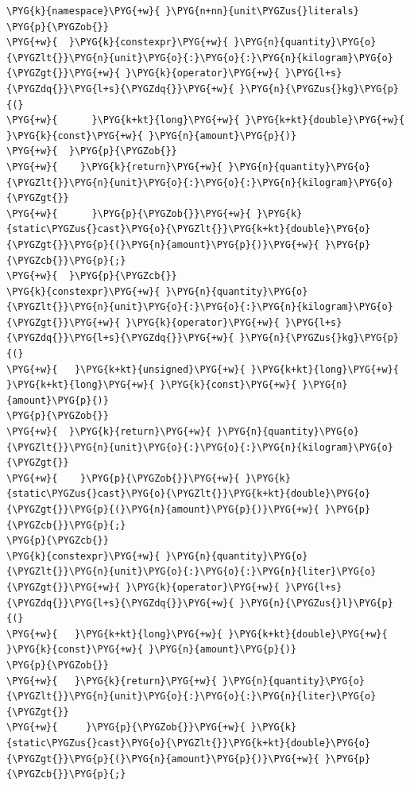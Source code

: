 \begin{itemize}

\begin{codeblockbg}
\begin{Verbatim}[commandchars=\\\{\},breaklines=true,breakanywhere=true,fontsize=\codefont,xleftmargin=17bp]
\PYG{k}{namespace}\PYG{+w}{ }\PYG{n+nn}{unit\PYGZus{}literals}
\PYG{p}{\PYGZob{}}
\PYG{+w}{  }\PYG{k}{constexpr}\PYG{+w}{ }\PYG{n}{quantity}\PYG{o}{\PYGZlt{}}\PYG{n}{unit}\PYG{o}{:}\PYG{o}{:}\PYG{n}{kilogram}\PYG{o}{\PYGZgt{}}\PYG{+w}{ }\PYG{k}{operator}\PYG{+w}{ }\PYG{l+s}{\PYGZdq{}}\PYG{l+s}{\PYGZdq{}}\PYG{+w}{ }\PYG{n}{\PYGZus{}kg}\PYG{p}{(}
\PYG{+w}{      }\PYG{k+kt}{long}\PYG{+w}{ }\PYG{k+kt}{double}\PYG{+w}{ }\PYG{k}{const}\PYG{+w}{ }\PYG{n}{amount}\PYG{p}{)}
\PYG{+w}{  }\PYG{p}{\PYGZob{}}
\PYG{+w}{    }\PYG{k}{return}\PYG{+w}{ }\PYG{n}{quantity}\PYG{o}{\PYGZlt{}}\PYG{n}{unit}\PYG{o}{:}\PYG{o}{:}\PYG{n}{kilogram}\PYG{o}{\PYGZgt{}}
\PYG{+w}{      }\PYG{p}{\PYGZob{}}\PYG{+w}{ }\PYG{k}{static\PYGZus{}cast}\PYG{o}{\PYGZlt{}}\PYG{k+kt}{double}\PYG{o}{\PYGZgt{}}\PYG{p}{(}\PYG{n}{amount}\PYG{p}{)}\PYG{+w}{ }\PYG{p}{\PYGZcb{}}\PYG{p}{;}
\PYG{+w}{  }\PYG{p}{\PYGZcb{}}
\PYG{k}{constexpr}\PYG{+w}{ }\PYG{n}{quantity}\PYG{o}{\PYGZlt{}}\PYG{n}{unit}\PYG{o}{:}\PYG{o}{:}\PYG{n}{kilogram}\PYG{o}{\PYGZgt{}}\PYG{+w}{ }\PYG{k}{operator}\PYG{+w}{ }\PYG{l+s}{\PYGZdq{}}\PYG{l+s}{\PYGZdq{}}\PYG{+w}{ }\PYG{n}{\PYGZus{}kg}\PYG{p}{(}
\PYG{+w}{   }\PYG{k+kt}{unsigned}\PYG{+w}{ }\PYG{k+kt}{long}\PYG{+w}{ }\PYG{k+kt}{long}\PYG{+w}{ }\PYG{k}{const}\PYG{+w}{ }\PYG{n}{amount}\PYG{p}{)}
\PYG{p}{\PYGZob{}}
\PYG{+w}{  }\PYG{k}{return}\PYG{+w}{ }\PYG{n}{quantity}\PYG{o}{\PYGZlt{}}\PYG{n}{unit}\PYG{o}{:}\PYG{o}{:}\PYG{n}{kilogram}\PYG{o}{\PYGZgt{}}
\PYG{+w}{    }\PYG{p}{\PYGZob{}}\PYG{+w}{ }\PYG{k}{static\PYGZus{}cast}\PYG{o}{\PYGZlt{}}\PYG{k+kt}{double}\PYG{o}{\PYGZgt{}}\PYG{p}{(}\PYG{n}{amount}\PYG{p}{)}\PYG{+w}{ }\PYG{p}{\PYGZcb{}}\PYG{p}{;}
\PYG{p}{\PYGZcb{}}
\PYG{k}{constexpr}\PYG{+w}{ }\PYG{n}{quantity}\PYG{o}{\PYGZlt{}}\PYG{n}{unit}\PYG{o}{:}\PYG{o}{:}\PYG{n}{liter}\PYG{o}{\PYGZgt{}}\PYG{+w}{ }\PYG{k}{operator}\PYG{+w}{ }\PYG{l+s}{\PYGZdq{}}\PYG{l+s}{\PYGZdq{}}\PYG{+w}{ }\PYG{n}{\PYGZus{}l}\PYG{p}{(}
\PYG{+w}{   }\PYG{k+kt}{long}\PYG{+w}{ }\PYG{k+kt}{double}\PYG{+w}{ }\PYG{k}{const}\PYG{+w}{ }\PYG{n}{amount}\PYG{p}{)}
\PYG{p}{\PYGZob{}}
\PYG{+w}{   }\PYG{k}{return}\PYG{+w}{ }\PYG{n}{quantity}\PYG{o}{\PYGZlt{}}\PYG{n}{unit}\PYG{o}{:}\PYG{o}{:}\PYG{n}{liter}\PYG{o}{\PYGZgt{}}
\PYG{+w}{     }\PYG{p}{\PYGZob{}}\PYG{+w}{ }\PYG{k}{static\PYGZus{}cast}\PYG{o}{\PYGZlt{}}\PYG{k+kt}{double}\PYG{o}{\PYGZgt{}}\PYG{p}{(}\PYG{n}{amount}\PYG{p}{)}\PYG{+w}{ }\PYG{p}{\PYGZcb{}}\PYG{p}{;}

\end{Verbatim}
\end{codeblockbg}
\end{itemize}
